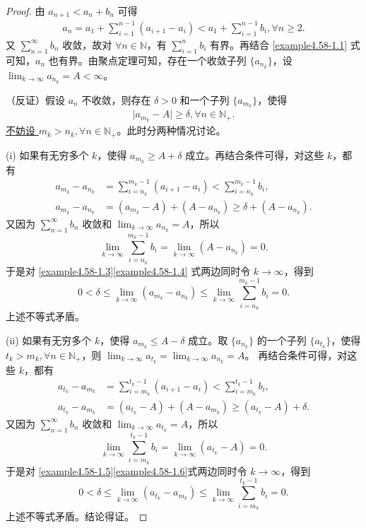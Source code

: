 \documentclass[lang=cn,newtx,10pt,scheme=chinese]{elegantbook}
\begin{document}
\begin{proof}
由 \(a_{n + 1} < a_n + b_n\) 可得
\begin{align}
a_n = a_1 + \sum_{i = 1}^{n - 1} (a_{i + 1} - a_i) < a_1 + \sum_{i = 1}^{n - 1} b_i, \forall n \geqslant 2. \label{example4.58-1.1}
\end{align}
又 \(\sum_{n = 1}^{\infty} b_n\) 收敛，故对 \(\forall n \in \mathbb{N}\)，有 \(\sum_{i = 1}^n b_i\) 有界。再结合 \eqref{example4.58-1.1} 式可知，\(a_n\) 也有界。由聚点定理可知，存在一个收敛子列 \(\{ a_{n_k} \}\)，设 \(\lim_{k \to \infty} a_{n_k} = A < \infty\)。

（反证）假设 \(a_n\) 不收敛，则存在 \(\delta > 0\) 和一个子列 \(\{ a_{m_k} \}\)，使得
\begin{align*}
\vert a_{m_k} - A \vert \geqslant \delta, \forall n \in \mathbb{N}_+. 
\end{align*}
\hyperlink{example4.58不妨设的原因}{不妨设 \(m_k > n_k, \forall n \in \mathbb{N}_+\)}。此时分两种情况讨论。

(i) 如果有无穷多个 \(k\)，使得 \(a_{m_k} \geqslant A + \delta\) 成立。再结合条件可得，对这些 \(k\)，都有
\begin{align}
a_{m_k} - a_{n_k} &= \sum_{i = n_k}^{m_k - 1} (a_{i + 1} - a_i) < \sum_{i = n_k}^{m_k - 1} b_i, \label{example4.58-1.3}\\
a_{m_k} - a_{n_k} &= (a_{m_k} - A) + (A - a_{n_k}) \geqslant \delta + (A - a_{n_k}). \label{example4.58-1.4}
\end{align}
又因为 \(\sum_{n = 1}^{\infty} b_n\) 收敛和 \(\lim_{k \to \infty} a_{n_k} = A\)，所以
\[
\lim_{k \to \infty} \sum_{i = n_k}^{m_k - 1} b_i = \lim_{k \to \infty} (A - a_{n_k}) = 0.
\]
于是对 \eqref{example4.58-1.3}\eqref{example4.58-1.4} 式两边同时令 \(k \to \infty\)，得到
\[
0 < \delta \leqslant \lim_{k \to \infty} (a_{m_k} - a_{n_k}) \leqslant \lim_{k \to \infty} \sum_{i = n_k}^{m_k - 1} b_i = 0.
\]
上述不等式矛盾。

(ii) 如果有无穷多个 \(k\)，使得 \(a_{m_k} \leqslant A - \delta\) 成立。取 \(\{ a_{n_k} \}\) 的一个子列 \(\{ a_{t_k} \}\)，使得 \(t_k > m_k, \forall n \in \mathbb{N}_+\)，则 \(\lim_{k \to \infty} a_{t_k} = \lim_{k \to \infty} a_{n_k} = A\)。
再结合条件可得，对这些 \(k\)，都有
\begin{align}
a_{t_k} - a_{m_k} &= \sum_{i = m_k}^{t_k - 1} (a_{i + 1} - a_i) < \sum_{i = m_k}^{t_k - 1} b_i, \label{example4.58-1.5}\\
a_{t_k} - a_{m_k} &= (a_{t_k} - A) + (A - a_{m_k}) \geqslant (a_{t_k} - A) + \delta. \label{example4.58-1.6}
\end{align}
又因为 \(\sum_{n = 1}^{\infty} b_n\) 收敛和 \(\lim_{k \to \infty} a_{t_k} = A\)，所以
\[
\lim_{k \to \infty} \sum_{i = m_k}^{t_k - 1} b_i = \lim_{k \to \infty} (a_{t_k} - A) = 0.
\]
于是对 \eqref{example4.58-1.5}\eqref{example4.58-1.6}式两边同时令 \(k \to \infty\)，得到
\[
0 < \delta \leqslant \lim_{k \to \infty} (a_{t_k} - a_{m_k}) \leqslant \lim_{k \to \infty} \sum_{i = m_k}^{t_k - 1} b_i = 0.
\]
上述不等式矛盾。结论得证。
\end{proof}
\end{document}
